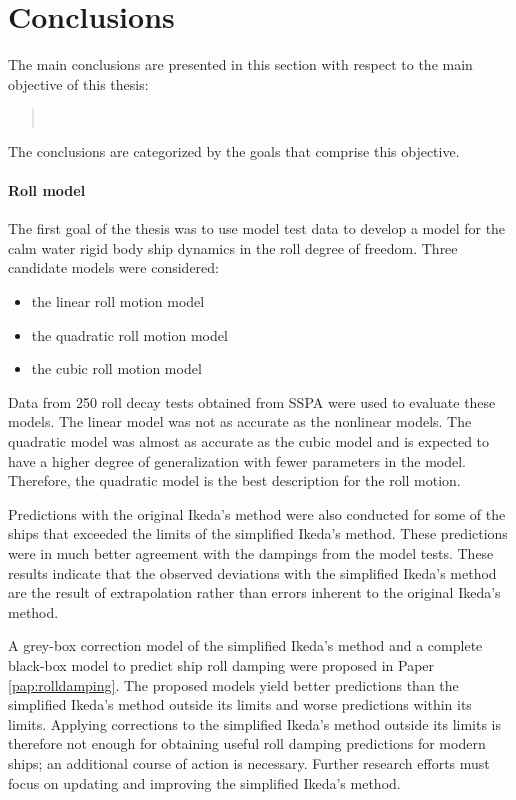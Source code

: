 \chapter{Conclusions\label{ch:conclusions}}
The main conclusions are presented in this section with respect to the main objective of this thesis:
\begin{quote} 
\vspace{0.1cm}
\objective \\
\vspace{-0.3cm}
\end{quote}
\noindent The conclusions are categorized by the goals that comprise this objective.

\subsubsection*{\normalfont \color{black} \textbf{Roll model}}
The first goal of the thesis was to use model test data to develop a model for the calm water rigid body ship dynamics in the roll degree of freedom. 
Three candidate models were considered:
\vspace{5pt}
\begin{itemize}
    \setlength\itemsep{5pt}
    \item the linear roll motion model
    \item the quadratic roll motion model
    \item the cubic roll motion model
\end{itemize}
\vspace{5pt}
\noindent Data from 250 roll decay tests obtained from SSPA were used to evaluate these models. The linear model was not as accurate as the nonlinear models. The quadratic model was almost as accurate as the cubic model and is expected to have a higher degree of generalization with fewer parameters in the model. Therefore,  the quadratic model is the best description for the roll motion. 

Predictions with the original Ikeda's method were also conducted for some of the ships that exceeded the limits of the simplified Ikeda's method. These predictions were in much better agreement with the dampings from the model tests. These results indicate that the observed deviations with the simplified Ikeda's method are the result of extrapolation rather than errors inherent 
to the original Ikeda's method.

A grey-box correction model of the simplified Ikeda's method and a complete black-box model to predict ship roll damping were proposed in Paper \ref{pap:rolldamping}. The proposed models yield better predictions than the simplified Ikeda's method outside its limits and worse predictions within its limits. Applying corrections to the simplified Ikeda's method outside its limits is therefore not enough for obtaining useful roll damping predictions for modern ships; an additional course of action is necessary. Further research efforts must focus on updating and improving the simplified Ikeda's method.

